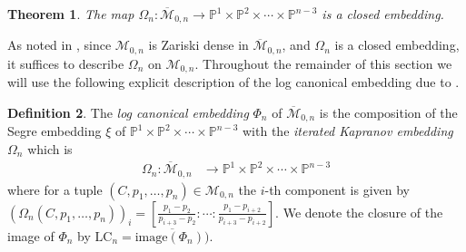 \documentclass[12pt, reqno]{amsart}
\numberwithin{equation}{section}
\theoremstyle{plain}
\newtheorem{theorem}{Theorem}[section]
\theoremstyle{definition}
\newtheorem{definition}[theorem]{Definition}
\newcommand{\pp}{\mathbb{P}}
\newcommand{\cm}{\mathcal{M}}
\newcommand{\monbar}{\overline{\mathcal{M}}_{0, n}}
\newcommand{\lc}{\mathrm{LC}}
\begin{document}
\begin{theorem}\cite[Corollary 2.7]{keel2009equations}
The map $\Omega_n: \monbar \to \pp^1 \times \pp^2 \times \cdots \times \pp^{n-3}$ is a closed embedding. 
\end{theorem}


As noted in \cite{monin2017equations}, since $\cm_{0, n}$ is Zariski dense in $\monbar$, and $\Omega_n$ is a closed embedding, it suffices to describe $\Omega_n$ on $\cm_{0, n}$. Throughout the remainder of this section we will use the following explicit description of the log canonical embedding due to \cite{monin2017equations}. 


\begin{definition}\cite{keel2009equations}
The \emph{log canonical embedding} $\Phi_n$ of $\monbar$ is the composition of the Segre embedding $\xi$ of $\pp^1 \times \pp^2 \times \cdots \times \pp^{n-3}$ with the \emph{iterated Kapranov embedding} $\Omega_n$ which is
\begin{align*}
\Omega_n: \monbar &\to \pp^1 \times \pp^2 \times \cdots \times \pp^{n-3} 
\end{align*}
where for a tuple $(C, p_1, \ldots, p_n) \in \cm_{0, n}$ the $i$-th component is given by $(\Omega_n(C, p_1, \ldots, p_n))_i = [\frac{p_1 -p_2}{p_{i+3}-p_2}:\cdots:\frac{p_1 -p_{i+2}}{p_{i+3}-p_{i+2}}]$. We denote the closure of the image of $\Phi_n$ by $\lc_n = \overline{\mathrm{image}(\Phi_n))}$. 
\end{definition}
\end{document}
